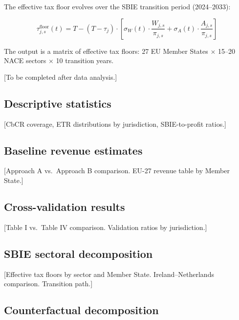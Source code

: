 \documentclass[11pt,a4paper]{article}
\begin{document}
The effective tax floor evolves over the SBIE transition period (2024--2033):

\begin{equation}\label{eq:floor_transition}
\tau_{j,s}^{\text{floor}}(t) = T - (T - \tau_j) \cdot \left[\sigma_W(t) \cdot \frac{W_{j,s}}{\pi_{j,s}} + \sigma_A(t) \cdot \frac{A_{j,s}}{\pi_{j,s}}\right]
\end{equation}

The output is a matrix of effective tax floors: 27 EU Member States $\times$ 15--20 NACE sectors $\times$ 10 transition years.







[To be completed after data analysis.]

\subsection{Descriptive statistics}\label{sec:descriptive}

[CbCR coverage, ETR distributions by jurisdiction, SBIE-to-profit ratios.]

\subsection{Baseline revenue estimates}\label{sec:baseline_results}

[Approach A vs.\ Approach B comparison. EU-27 revenue table by Member State.]

\subsection{Cross-validation results}\label{sec:crossval_results}

[Table I vs.\ Table IV comparison. Validation ratios by jurisdiction.]

\subsection{SBIE sectoral decomposition}\label{sec:sbie_results}

[Effective tax floors by sector and Member State. Ireland--Netherlands comparison. Transition path.]

\subsection{Counterfactual decomposition}\label{sec:decomp_results}
\end{document}
